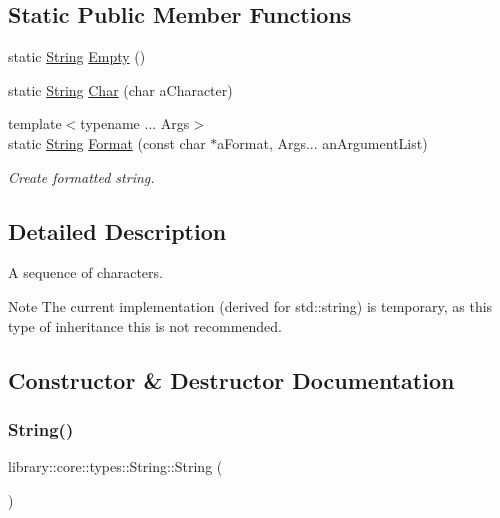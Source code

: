 \subsection*{Static Public Member Functions}
\begin{DoxyCompactItemize}
\item 
static \hyperlink{classlibrary_1_1core_1_1types_1_1_string}{String} \hyperlink{classlibrary_1_1core_1_1types_1_1_string_a4d359cb0dba46e14ca46f90e728c2b96}{Empty} ()
\item 
static \hyperlink{classlibrary_1_1core_1_1types_1_1_string}{String} \hyperlink{classlibrary_1_1core_1_1types_1_1_string_abbc5a795da1a72d1456ba4950e62602c}{Char} (char a\+Character)
\item 
{\footnotesize template$<$typename ... Args$>$ }\\static \hyperlink{classlibrary_1_1core_1_1types_1_1_string}{String} \hyperlink{classlibrary_1_1core_1_1types_1_1_string_ae1745f54be6952d7b5a388239377b287}{Format} (const char $\ast$a\+Format, Args... an\+Argument\+List)
\begin{DoxyCompactList}\small\item\em Create formatted string. \end{DoxyCompactList}\end{DoxyCompactItemize}


\subsection{Detailed Description}
A sequence of characters. 

\begin{DoxyNote}{Note}
The current implementation (derived for std\+::string) is temporary, as this type of inheritance this is not recommended. 
\end{DoxyNote}


\subsection{Constructor \& Destructor Documentation}
\mbox{\label{classlibrary_1_1core_1_1types_1_1_string_ab49dec039a75f0049c95759141b6d484}} 
\subsubsection{\texorpdfstring{String()}{String()}\hspace{0.1cm}{\footnotesize\ttfamily [1/2]}}
{\footnotesize\ttfamily library\+::core\+::types\+::\+String\+::\+String (\begin{DoxyParamCaption}{ }\end{DoxyParamCaption})}

